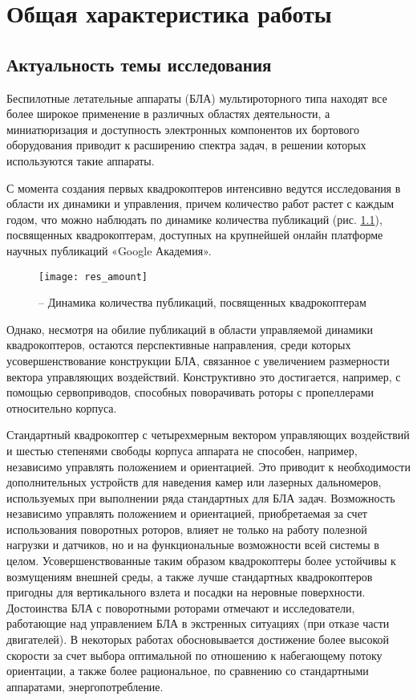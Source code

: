 
\chapter{Общая характеристика работы}

\section{Актуальность темы исследования}

Беспилотные летательные аппараты (БЛА) мультироторного типа находят все более широкое применение в различных областях деятельности, а миниатюризация и доступность электронных компонентов их бортового оборудования приводит к расширению спектра задач, в решении которых используются такие аппараты.

С момента создания первых квадрокоптеров интенсивно ведутся исследования в области их динамики и управления, причем количество работ растет с каждым годом, что можно наблюдать по динамике количества публикаций (рис. \ref{pic:res_amount}), посвященных квадрокоптерам, доступных на крупнейшей онлайн платформе научных публикаций «Google Академия».

\begin{figure}[h!]
	\centering
	\texttt{[image: res\_amount]}
	\caption{ -- Динамика количества публикаций, посвященных квадрокоптерам}
	\label{pic:res_amount}
\end{figure}

Однако, несмотря на обилие публикаций в области управляемой динамики квадрокоптеров, остаются перспективные направления, среди которых усовершенствование конструкции БЛА, связанное с увеличением размерности вектора управляющих воздействий.
Конструктивно это достигается, например, с помощью сервоприводов, способных поворачивать роторы с пропеллерами относительно корпуса.

Стандартный квадрокоптер с четырехмерным вектором управляющих воздействий и шестью степенями свободы корпуса аппарата не способен, например, независимо управлять положением и ориентацией.
Это приводит к необходимости дополнительных устройств для наведения камер или лазерных дальномеров, используемых при выполнении ряда стандартных для БЛА задач.
Возможность независимо управлять положением и ориентацией, приобретаемая за счет использования поворотных роторов, влияет не только на работу полезной нагрузки и датчиков, но и на функциональные возможности всей системы в целом.
Усовершенствованные таким образом квадрокоптеры более устойчивы к возмущениям внешней среды, а также лучше стандартных квадрокоптеров пригодны для вертикального взлета и посадки на неровные поверхности.
Достоинства БЛА с поворотными роторами отмечают и исследователи, работающие над управлением БЛА в экстренных ситуациях (при отказе части двигателей).
В некоторых работах обосновывается достижение более высокой скорости за счет выбора оптимальной по отношению к набегающему потоку ориентации, а также более рациональное, по сравнению со стандартными аппаратами, энергопотребление.

